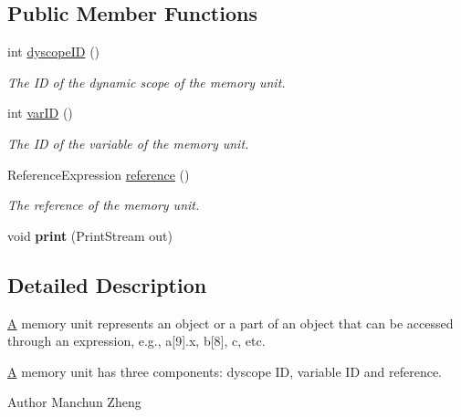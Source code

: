 \subsection*{Public Member Functions}
\begin{DoxyCompactItemize}
\item 
int \hyperlink{interfaceedu_1_1udel_1_1cis_1_1vsl_1_1civl_1_1state_1_1IF_1_1MemoryUnit_a0b13f1febc63b7a1b93ea68c072457cd}{dyscope\+I\+D} ()
\begin{DoxyCompactList}\small\item\em The I\+D of the dynamic scope of the memory unit. \end{DoxyCompactList}\item 
int \hyperlink{interfaceedu_1_1udel_1_1cis_1_1vsl_1_1civl_1_1state_1_1IF_1_1MemoryUnit_a13a6246faf7dfcc1329992570e77bf1c}{var\+I\+D} ()
\begin{DoxyCompactList}\small\item\em The I\+D of the variable of the memory unit. \end{DoxyCompactList}\item 
Reference\+Expression \hyperlink{interfaceedu_1_1udel_1_1cis_1_1vsl_1_1civl_1_1state_1_1IF_1_1MemoryUnit_a8501f34fb25505e826f16c18a3255c88}{reference} ()
\begin{DoxyCompactList}\small\item\em The reference of the memory unit. \end{DoxyCompactList}\item 
\hypertarget{interfaceedu_1_1udel_1_1cis_1_1vsl_1_1civl_1_1state_1_1IF_1_1MemoryUnit_ac195b554a4a4dd1bd4ccb2ff49708e0b}{}void {\bfseries print} (Print\+Stream out)\label{interfaceedu_1_1udel_1_1cis_1_1vsl_1_1civl_1_1state_1_1IF_1_1MemoryUnit_ac195b554a4a4dd1bd4ccb2ff49708e0b}

\end{DoxyCompactItemize}


\subsection{Detailed Description}
\hyperlink{structA}{A} memory unit represents an object or a part of an object that can be accessed through an expression, e.\+g., a\mbox{[}9\mbox{]}.x, b\mbox{[}8\mbox{]}, c, etc. 

\hyperlink{structA}{A} memory unit has three components\+: dyscope I\+D, variable I\+D and reference.

\begin{DoxyAuthor}{Author}
Manchun Zheng 
\end{DoxyAuthor}


